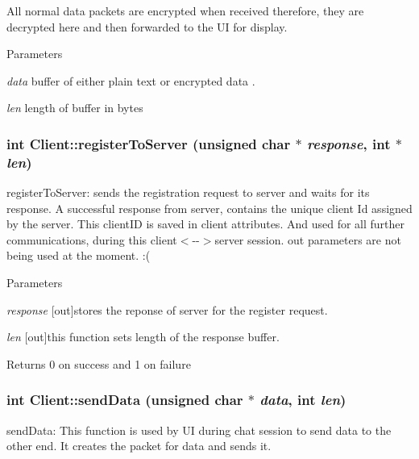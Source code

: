 All normal data packets are encrypted when received therefore, they are decrypted here and then forwarded to the UI for display.


\begin{DoxyParams}{Parameters}
\item[{\em data}]buffer of either plain text or encrypted data . \item[{\em len}]length of buffer in bytes \end{DoxyParams}
\hypertarget{classClient_af47e3d9fab8c28ceeb709287a726660b}{
\subsubsection[{registerToServer}]{\setlength{\rightskip}{0pt plus 5cm}int Client::registerToServer (unsigned char $\ast$ {\em response}, \/  int $\ast$ {\em len})}}
\label{classClient_af47e3d9fab8c28ceeb709287a726660b}
registerToServer: sends the registration request to server and waits for its response. A successful response from server, contains the unique client Id assigned by the server. This clientID is saved in client attributes. And used for all further communications, during this client$<$-\/-\/$>$server session. out parameters are not being used at the moment. :( 
\begin{DoxyParams}{Parameters}
\item[{\em response}]\mbox{[}out\mbox{]}stores the reponse of server for the register request. \item[{\em len}]\mbox{[}out\mbox{]}this function sets length of the response buffer.\end{DoxyParams}
\begin{DoxyReturn}{Returns}
0 on success and 1 on failure 
\end{DoxyReturn}
\hypertarget{classClient_a851cbb91211093de7983127c68eab263}{
\subsubsection[{sendData}]{\setlength{\rightskip}{0pt plus 5cm}int Client::sendData (unsigned char $\ast$ {\em data}, \/  int {\em len})}}
\label{classClient_a851cbb91211093de7983127c68eab263}
sendData: This function is used by UI during chat session to send data to the other end. It creates the packet for data and sends it. 

